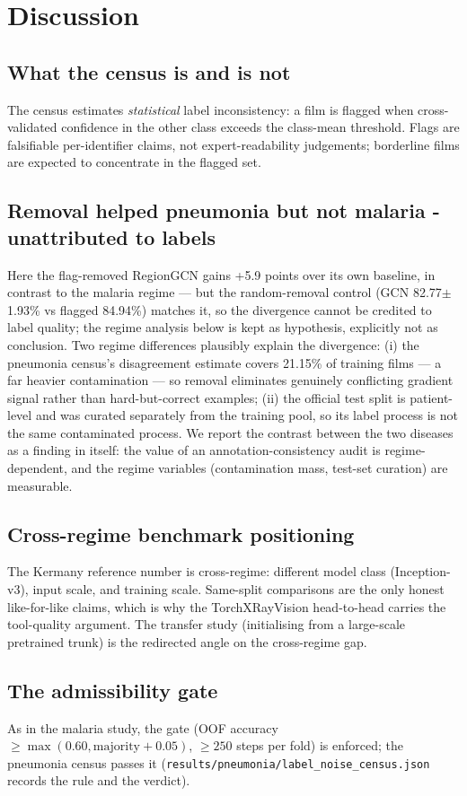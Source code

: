 \section{Discussion}
\subsection{What the census is and is not}
The census estimates \emph{statistical} label inconsistency: a film is
flagged when cross-validated confidence in the other class exceeds the
class-mean threshold. Flags are falsifiable per-identifier claims, not
expert-readability judgements; borderline films are expected to concentrate
in the flagged set.
\subsection{Removal helped pneumonia but not malaria - unattributed to labels}
Here the flag-removed RegionGCN gains +5.9 points over its own baseline, in contrast to the malaria regime --- but the random-removal control (GCN 82.77$\pm$1.93\% vs flagged 84.94\%) matches it, so the divergence cannot be credited to label quality; the regime analysis below is kept as hypothesis, explicitly not as conclusion. Two regime differences plausibly explain
the divergence: (i) the pneumonia census's disagreement estimate covers 21.15\% of training films
--- a far heavier contamination --- so removal eliminates genuinely
conflicting gradient signal rather than hard-but-correct examples; (ii)
the official test split is patient-level and was curated separately from
the training pool, so its label process is not the same contaminated
process. We report the contrast between the two diseases as a finding in
itself: the value of an annotation-consistency audit is regime-dependent, and the
regime variables (contamination mass, test-set curation) are measurable.
\subsection{Cross-regime benchmark positioning}
The Kermany reference number is cross-regime: different model class
(Inception-v3), input scale, and training scale. Same-split comparisons
are the only honest like-for-like claims, which is why the TorchXRayVision
head-to-head carries the tool-quality argument. The transfer study
(initialising from a large-scale pretrained trunk) is the redirected angle
on the cross-regime gap.
\subsection{The admissibility gate}
As in the malaria study, the gate (OOF accuracy
$\ge \max(0.60, \text{majority}+0.05)$, $\ge 250$ steps per fold) is
enforced; the pneumonia census passes it
(\texttt{results/pneumonia/label\_noise\_census.json} records the rule and
the verdict).

